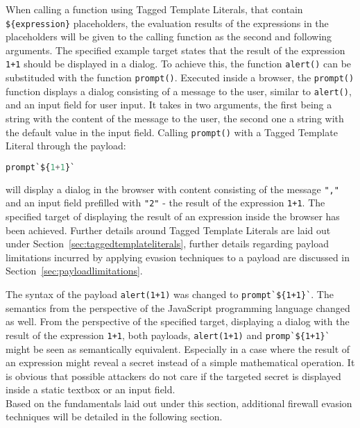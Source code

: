 When calling a function using Tagged Template Literals, that contain \verb|${expression}| placeholders, the evaluation results of the expressions in the placeholders will be given to the calling function as the second and following arguments.
The specified example target states that the result of the expression \verb|1+1| should be displayed in a dialog.
To achieve this, the function \verb|alert()| can be substituded with the function \verb|prompt()|. Executed inside a browser, the \verb|prompt()| function displays a dialog consisting of a message to the user, similar to \verb|alert()|, and an input field for user input. It takes in two arguments, the first being a string with the content of the message to the user, the second one a string with the default value in the input field. 
Calling \verb|prompt()| with a Tagged Template Literal through the payload:
\begin{lstlisting}[style=basicStyle, language=Python]
prompt`${1+1}`
\end{lstlisting}
will display a dialog in the browser with content consisting of the message \verb|","| and an input field prefilled with \verb|"2"| - the result of the expression \verb|1+1|. The specified target of displaying the result of an expression inside the browser has been achieved.
Further details around Tagged Template Literals are laid out under Section~\ref{sec:taggedtemplateliterals}, further details regarding payload limitations incurred by applying evasion techniques to a payload are discussed in Section~\ref{sec:payloadlimitations}. 
\cite{js/taggedtemplates,js/alert,js/prompt}

The syntax of the payload \verb|alert(1+1)| was changed to \verb|prompt`${1+1}`|. The semantics from the perspective of the JavaScript programming language changed as well. From the perspective of the specified target, displaying a dialog with the result of the expression \verb|1+1|, both payloads, \verb|alert(1+1)| and \verb|promp`${1+1}`| might be seen as semantically equivalent. Especially in a case where the result of an expression might reveal a secret instead of a simple mathematical operation. It is obvious that possible attackers do not care if the targeted secret is displayed inside a static textbox or an input field. \\

Based on the fundamentals laid out under this section, additional firewall evasion techniques will be detailed in the following section.

